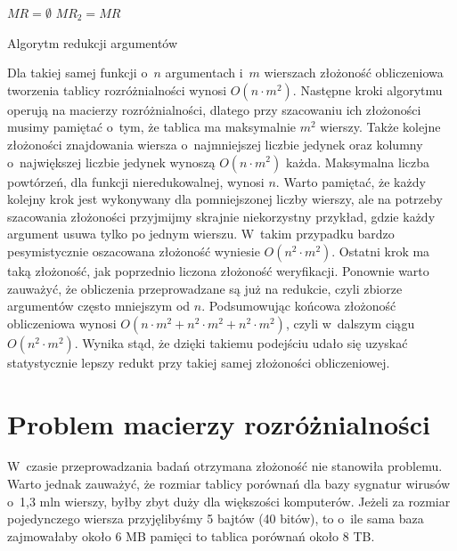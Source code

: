 \begin{algorithm}[h]
    $MR=\emptyset$\;
    $MR_2 = MR$\;
    \caption{Algorytm redukcji argumentów}
    \label{alg:reduction}
\end{algorithm}

Dla takiej samej funkcji o~$n$ argumentach i~$m$ wierszach złożoność obliczeniowa tworzenia tablicy rozróżnialności wynosi $O(n \cdot m^2)$.
Następne kroki algorytmu operują na macierzy rozróżnialności,
dlatego przy szacowaniu ich złożoności musimy pamiętać o~tym,
że tablica ma maksymalnie $m^2$ wierszy.
Także kolejne złożoności znajdowania wiersza o~najmniejszej liczbie jedynek oraz kolumny o~największej liczbie jedynek wynoszą $O(n \cdot m^2)$ każda.
Maksymalna liczba powtórzeń,
dla funkcji nieredukowalnej,
wynosi $n$.
Warto pamiętać,
że każdy kolejny krok jest wykonywany dla pomniejszonej liczby wierszy,
ale na potrzeby szacowania złożoności przyjmijmy skrajnie niekorzystny przykład,
gdzie każdy argument usuwa tylko po jednym wierszu.
W~takim przypadku bardzo pesymistycznie oszacowana złożoność wyniesie $O(n^2 \cdot m^2)$.
Ostatni krok ma taką złożoność,
jak poprzednio liczona złożoność weryfikacji.
Ponownie warto zauważyć,
że obliczenia przeprowadzane są już na redukcie,
czyli zbiorze argumentów często mniejszym od $n$.
Podsumowując końcowa złożoność obliczeniowa wynosi $O(n \cdot m^2 + n^2 \cdot m^2 + n^2 \cdot m^2)$,
czyli w~dalszym ciągu $O(n^2 \cdot m^2)$.
Wynika stąd,
że dzięki takiemu podejściu udało się uzyskać statystycznie lepszy redukt przy takiej samej złożoności obliczeniowej.


\section{Problem macierzy rozróżnialności}

W~czasie przeprowadzania badań otrzymana złożoność nie stanowiła problemu.
Warto jednak zauważyć,
że rozmiar tablicy porównań dla bazy sygnatur wirusów o~1,3 mln wierszy,
byłby zbyt duży dla większości komputerów.
Jeżeli za rozmiar pojedynczego wiersza przyjęlibyśmy 5 bajtów (40 bitów), to o~ile sama baza zajmowałaby około 6 MB pamięci to tablica porównań około 8 TB.

